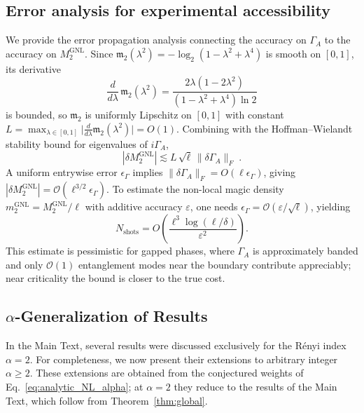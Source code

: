 \documentclass[prx,twocolumn,superscriptaddress,aps,10pt, frontmatterverbose, reprint,footinbib,longbibliography=true]{revtex4-2}
\begin{document}
\subsection{Error analysis for experimental accessibility}
\label{app:experimental}
We provide the error propagation analysis connecting the accuracy on $\Gamma_A$ to the accuracy on $M_2^{\mathrm{GNL}}$.
Since $\mathfrak{m}_2(\lambda^2) = -\log_2(1-\lambda^2+\lambda^4)$ is smooth on $[0,1]$, its derivative
\begin{equation}
    \frac{d}{d\lambda}\,\mathfrak{m}_2(\lambda^2) = \frac{2\lambda(1-2\lambda^2)}{(1-\lambda^2+\lambda^4)\ln 2}
\end{equation}
is bounded, so $\mathfrak{m}_2$ is uniformly Lipschitz on $[0,1]$ with constant $L = \max_{\lambda \in [0,1]} \bigl|\frac{d}{d\lambda}\mathfrak{m}_2(\lambda^2)\bigr| = O(1)$.
Combining with the Hoffman--Wielandt stability bound for eigenvalues of $i\Gamma_A$,
\begin{equation}
    |\delta M_2^{\mathrm{GNL}}| \lesssim L\,\sqrt{\ell}\,\|\delta\Gamma_A\|_F\;.
\end{equation}
A uniform entrywise error $\epsilon_\Gamma$ implies $\|\delta\Gamma_A\|_F = O(\ell \epsilon_\Gamma)$, giving $|\delta M_2^{\mathrm{GNL}}| = \mathcal{O}(\ell^{3/2}\epsilon_\Gamma)$.
To estimate the non-local magic density $m_2^{\mathrm{GNL}} = M_2^{\mathrm{GNL}}/\ell$ with additive accuracy $\varepsilon$, one needs $\epsilon_\Gamma = \mathcal{O}(\varepsilon/\sqrt{\ell})$, yielding
\begin{equation}
    N_{\mathrm{shots}} = O\!\left(\frac{\ell^3\log(\ell/\delta)}{\varepsilon^2}\right).
\end{equation}
This estimate is pessimistic for gapped phases, where $\Gamma_A$ is approximately banded and only $\mathcal{O}(1)$ entanglement modes near the boundary contribute appreciably; near criticality the bound is closer to the true cost.

\subsection{$\alpha$-Generalization of Results}
\label{Sec:generaliz}

In the Main Text, several results were discussed exclusively for the Rényi index $\alpha = 2$. For completeness, we now present their extensions to arbitrary integer $\alpha \ge 2$. These extensions are obtained from the conjectured weights of Eq.~\eqref{eq:analytic_NL_alpha}; at $\alpha=2$ they reduce to the results of the Main Text, which follow from Theorem~\ref{thm:global}.
\end{document}
